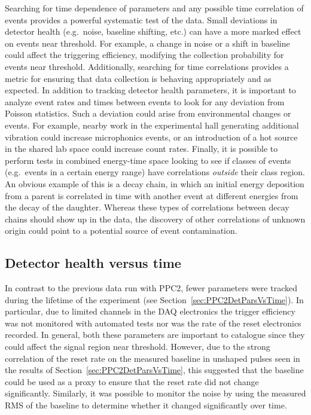 	Searching for time dependence of parameters and any possible time correlation of events provides a powerful systematic test of the data.  Small deviations in detector health (e.g.~noise, baseline shifting, etc.) can have a more marked effect on events near threshold.  For example, a change in noise or a shift in baseline could affect the triggering efficiency, modifying the collection probability for events near threshold.  Additionally, searching for time correlations provides a metric for ensuring that data collection is behaving appropriately and as expected.  In addition to tracking detector health parameters, it is important to analyze event rates and times between events to look for any deviation from Poisson statistics.  Such a deviation could arise from environmental changes or events.  For example, nearby work in the experimental hall generating additional vibration could increase microphonics events, or an introduction of a hot source in the shared lab space could increase count rates.  Finally, it is possible to perform tests in combined energy-time space looking to see if classes of events (e.g.~events in a certain energy range) have correlations \emph{outside} their class region.  An obvious example of this is a decay chain, in which an initial energy deposition from a parent is correlated in time with another event at different energies from the decay of the daughter.  Whereas these types of correlations between decay chains should show up in the data, the discovery of other correlations of unknown origin could point to a potential source of event contamination.  
	
		\subsection{Detector health versus time}
		\label{sec:BeGeParsVsTime}

	In contrast to the previous data run with PPC2, fewer parameters were tracked during the lifetime of the experiment (see Section~\ref{sec:PPC2DetParsVsTime}).  In particular, due to limited channels in the DAQ electronics the trigger efficiency was not monitored with automated tests nor was the rate of the reset electronics recorded.  In general, both these parameters are important to catalogue since they could affect the signal region near threshold.  However, due to the strong correlation of the reset rate on  the measured baseline in unshaped pulses seen in the results of Section~\ref{sec:PPC2DetParsVsTime},  this suggested that the baseline could be used as a proxy to ensure that the reset rate did not change significantly.  Similarly, it was possible to monitor the noise by using the measured RMS of the baseline to determine whether it changed significantly over time.  
	
